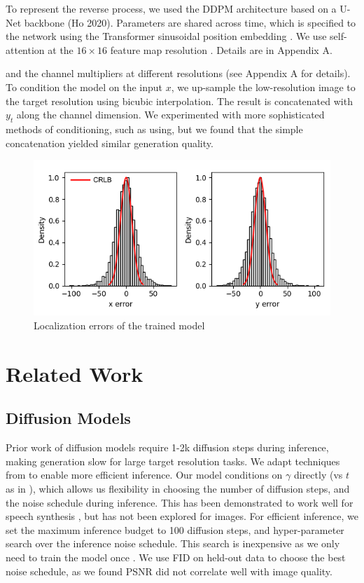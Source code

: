 \documentclass{article}
\begin{document}
To represent the reverse process, we used the DDPM architecture based on a U-Net backbone (Ho 2020). Parameters are shared across time, which is specified to the network using the Transformer sinusoidal position embedding \cite{cite60}. We use self-attention at the $16 \times 16$ feature map resolution \cite{cite63,cite60}. Details are in Appendix A.

and the channel multipliers at different resolutions (see Appendix A for details). To condition the model on the input $x$, we up-sample the low-resolution image to the target resolution using bicubic interpolation. The result is concatenated with $y_t$ along the channel dimension. We experimented with more sophisticated methods of conditioning, such as using, but we found that the simple concatenation yielded similar generation quality.

\begin{figure}
\centering
\includegraphics[scale=0.8]{Errors.png}
\caption{Localization errors of the trained model}
\end{figure}



\section{Related Work}

\subsection{Diffusion Models}

Prior work of diffusion models \cite{ref17, ref51} require 1-2k diffusion steps during inference, making generation slow for large target resolution tasks. We adapt techniques from \cite{ref6} to enable more efficient inference. Our model conditions on $\gamma$ directly (vs $t$ as in \cite{ref17}), which allows us flexibility in choosing the number of diffusion steps, and the noise schedule during inference. This has been demonstrated to work well for speech synthesis \cite{ref6}, but has not been explored for images. For efficient inference, we set the maximum inference budget to 100 diffusion steps, and hyper-parameter search over the inference noise schedule. This search is inexpensive as we only need to train the model once \cite{ref6}. We use FID on held-out data to choose the best noise schedule, as we found PSNR did not correlate well with image quality.
\end{document}
